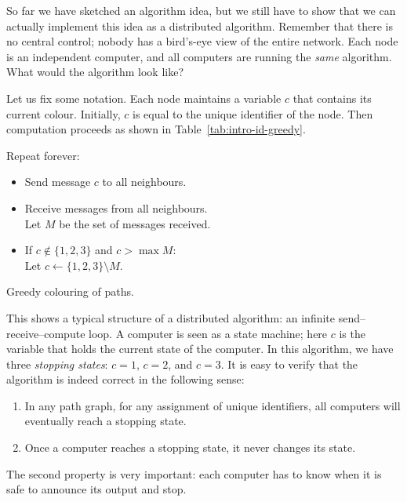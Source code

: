 So far we have sketched an algorithm idea, but we still have to show that we can actually implement this idea as a distributed algorithm. Remember that there is no central control; nobody has a bird's-eye view of the entire network. Each node is an independent computer, and all computers are running the \emph{same} algorithm. What would the algorithm look like?

Let us fix some notation. Each node maintains a variable $c$ that contains its current colour. Initially, $c$ is equal to the unique identifier of the node. Then computation proceeds as shown in Table~\ref{tab:intro-id-greedy}.

\begin{table}
    \raggedright
    \algtoprule
    \begin{descriptionb}
        \item[Repeat forever:] \mbox{}
        \begin{itemize}
            \item Send message $c$ to all neighbours.
            \item Receive messages from all neighbours. \\
                  Let $M$ be the set of messages received.
            \item If $c \notin \{1,2,3\}$ and $c > \max M$: \\
                  Let $c \gets \{1,2,3\} \setminus M$.
        \end{itemize}
    \end{descriptionb}
    \algbottomrule
    \caption{Greedy colouring of paths.}\label{tab:intro-id-greedy}
\end{table}

This shows a typical structure of a distributed algorithm: an infinite send--receive--compute loop. A computer is seen as a state machine; here $c$ is the variable that holds the current state of the computer. In this algorithm, we have three \emph{stopping states}: $c = 1$, $c = 2$, and $c = 3$. It is easy to verify that the algorithm is indeed correct in the following sense:
\begin{enumerate}
    \item In any path graph, for any assignment of unique identifiers, all computers will eventually reach a stopping state.
    \item Once a computer reaches a stopping state, it never changes its state.
\end{enumerate}
The second property is very important: each computer has to know when it is safe to announce its output and stop.

